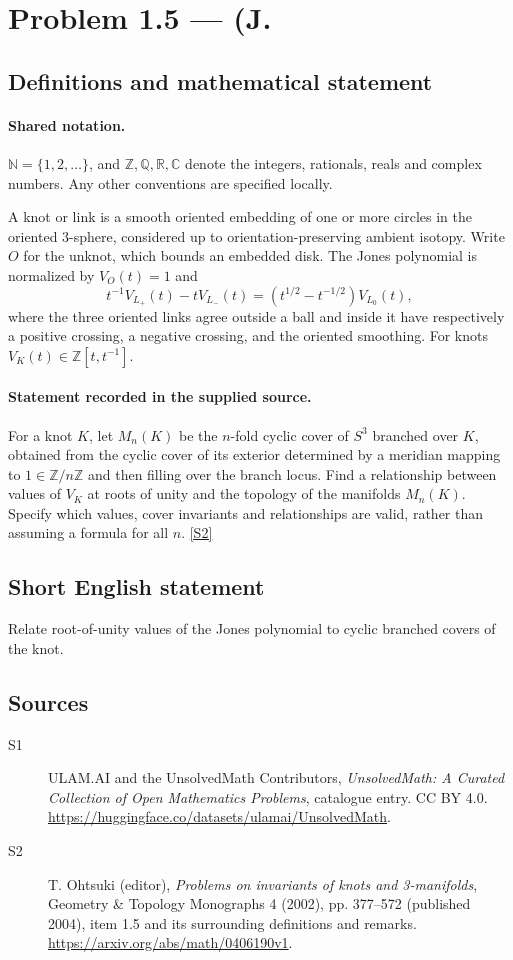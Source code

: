 \documentclass[11pt]{article}
\newcommand{\sref}[2]{\hyperlink{source:#1:#2}{[S#2]}}
\begin{document}
\section{Problem 1.5 — (J.}\label{statement}

\subsection{Definitions and mathematical statement}

\paragraph{Shared notation.}$\mathbb N=\{1,2,\ldots\}$, and $\mathbb Z,\mathbb Q,\mathbb R,\mathbb C$ denote the integers, rationals, reals and complex numbers. Any other conventions are specified locally.


A knot or link is a smooth oriented embedding of one or more circles in the oriented $3$-sphere, considered up to orientation-preserving ambient isotopy. Write $O$ for the unknot, which bounds an embedded disk. The Jones polynomial is normalized by $V_O(t)=1$ and
\[t^{-1}V_{L_+}(t)-tV_{L_-}(t)=(t^{1/2}-t^{-1/2})V_{L_0}(t),\]
where the three oriented links agree outside a ball and inside it have respectively a positive crossing, a negative crossing, and the oriented smoothing. For knots $V_K(t)\in\mathbb Z[t,t^{-1}]$.
\paragraph{Statement recorded in the supplied source.}
For a knot $K$, let $M_n(K)$ be the $n$-fold cyclic cover of $S^3$ branched over $K$, obtained from the cyclic cover of its exterior determined by a meridian mapping to $1\in\mathbb Z/n\mathbb Z$ and then filling over the branch locus. Find a relationship between values of $V_K$ at roots of unity and the topology of the manifolds $M_n(K)$. Specify which values, cover invariants and relationships are valid, rather than assuming a formula for all $n$. \sref{statement}{2}
\subsection{Short English statement}
Relate root-of-unity values of the Jones polynomial to cyclic branched covers of the knot.
\subsection{Sources}
\begin{description}
\item[\hypertarget{source:statement:1}{S1}] ULAM.AI and the UnsolvedMath Contributors, \emph{UnsolvedMath: A Curated Collection of Open Mathematics Problems}, catalogue entry. CC BY 4.0. \url{https://huggingface.co/datasets/ulamai/UnsolvedMath}.
\item[\hypertarget{source:statement:2}{S2}] T. Ohtsuki (editor), \emph{Problems on invariants of knots and 3-manifolds}, Geometry \& Topology Monographs 4 (2002), pp. 377--572 (published 2004), item 1.5 and its surrounding definitions and remarks. \url{https://arxiv.org/abs/math/0406190v1}.
\end{description}
\label{end:statement}
\end{document}
